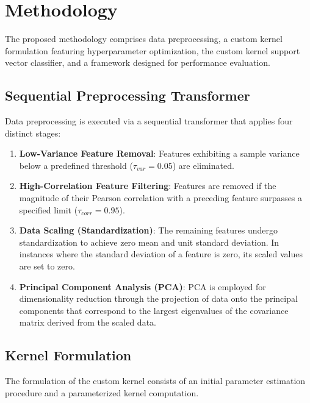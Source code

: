 \documentclass[conference]{IEEEtran}
\begin{document}
\section{Methodology}
The proposed methodology comprises data preprocessing, a custom kernel formulation featuring hyperparameter optimization, the custom kernel support vector classifier, and a framework designed for performance evaluation.

\subsection{Sequential Preprocessing Transformer}
Data preprocessing is executed via a sequential transformer that applies four distinct stages:
\begin{enumerate}
    \item \textbf{Low-Variance Feature Removal}: Features exhibiting a sample variance below a predefined threshold (\(\tau_{var} = 0.05\)) are eliminated.
    \item \textbf{High-Correlation Feature Filtering}: Features are removed if the magnitude of their Pearson correlation with a preceding feature surpasses a specified limit (\(\tau_{corr} = 0.95\)).
    \item \textbf{Data Scaling (Standardization)}: The remaining features undergo standardization to achieve zero mean and unit standard deviation. In instances where the standard deviation of a feature is zero, its scaled values are set to zero.
    \item \textbf{Principal Component Analysis (PCA)}: PCA is employed for dimensionality reduction through the projection of data onto the principal components that correspond to the largest eigenvalues of the covariance matrix derived from the scaled data.
\end{enumerate}

\subsection{Kernel Formulation}
The formulation of the custom kernel consists of an initial parameter estimation procedure and a parameterized kernel computation.
\end{document}
